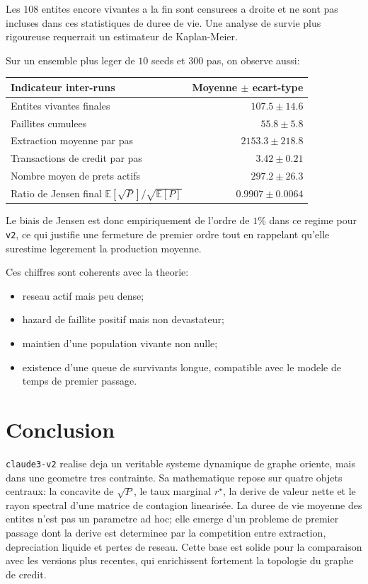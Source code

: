 \documentclass[11pt,a4paper]{article}
\begin{document}
Les $108$ entites encore vivantes a la fin sont censurees a droite et ne sont pas incluses dans ces statistiques de duree de vie. Une analyse de survie plus rigoureuse requerrait un estimateur de Kaplan-Meier.

Sur un ensemble plus leger de $10$ seeds et $300$ pas, on observe aussi:
\begin{center}
\begin{tabular}{lr}
\toprule
Indicateur inter-runs & Moyenne $\pm$ ecart-type \\
\midrule
Entites vivantes finales & $107.5 \pm 14.6$ \\
Faillites cumulees & $55.8 \pm 5.8$ \\
Extraction moyenne par pas & $2153.3 \pm 218.8$ \\
Transactions de credit par pas & $3.42 \pm 0.21$ \\
Nombre moyen de prets actifs & $297.2 \pm 26.3$ \\
Ratio de Jensen final $\mathbb E[\sqrt P]/\sqrt{\mathbb E[P]}$ & $0.9907 \pm 0.0064$ \\
\bottomrule
\end{tabular}
\end{center}

Le biais de Jensen est donc empiriquement de l'ordre de $1\%$ dans ce regime pour \texttt{v2}, ce qui justifie une fermeture de premier ordre tout en rappelant qu'elle surestime legerement la production moyenne.

Ces chiffres sont coherents avec la theorie:
\begin{itemize}
\item reseau actif mais peu dense;
\item hazard de faillite positif mais non devastateur;
\item maintien d'une population vivante non nulle;
\item existence d'une queue de survivants longue, compatible avec le modele de temps de premier passage.
\end{itemize}

\section{Conclusion}
\texttt{claude3-v2} realise deja un veritable systeme dynamique de graphe oriente, mais dans une geometre tres contrainte. Sa mathematique repose sur quatre objets centraux: la concavite de $\sqrt{P}$, le taux marginal $r^\star$, la derive de valeur nette et le rayon spectral d'une matrice de contagion linearisée. La duree de vie moyenne des entites n'est pas un parametre ad hoc; elle emerge d'un probleme de premier passage dont la derive est determinee par la competition entre extraction, depreciation liquide et pertes de reseau. Cette base est solide pour la comparaison avec les versions plus recentes, qui enrichissent fortement la topologie du graphe de credit.
\end{document}
